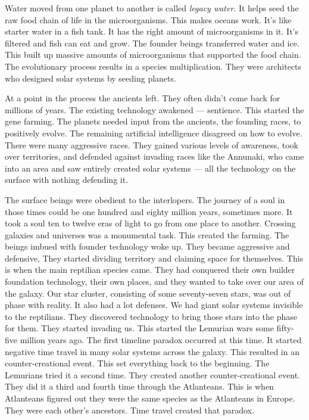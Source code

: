 Water moved from one planet to another is called \emph{legacy water}. It
helps seed the raw food chain of life in the microorganisms. This makes
oceans work. It's like starter water in a fish tank. It has the right
amount of microorganisms in it. It's filtered and fish can eat and grow.
The founder beings transferred water and ice. This built up massive
amounts of microorganisms that supported the food chain. The
evolutionary process results in a species multiplication. They were
architects who designed solar systems by seeding planets.

At a point in the process the ancients left. They often didn't come back
for millions of years. The existing technology awakened --- sentience.
This started the gene farming. The planets needed input from the
ancients, the founding races, to positively evolve. The remaining
artificial intelligence disagreed on how to evolve. There were many
aggressive races. They gained various levels of awareness, took over
territories, and defended against invading races like the Annunaki, who
came into an area and saw entirely created solar systems --- all the
technology on the surface with nothing defending it.

The surface beings were obedient to the interlopers. The journey of a
soul in those times could be one hundred and eighty million years,
sometimes more. It took a soul ten to twelve eras of light to go from
one place to another. Crossing galaxies and universes was a monumental
task. This created the farming. The beings imbued with founder
technology woke up. They became aggressive and defensive, They started
dividing territory and claiming space for themselves. This is when the
main reptilian species came. They had conquered their own builder
foundation technology, their own places, and they wanted to take over
our area of the galaxy. Our star cluster, consisting of some
seventy-seven stars, was out of phase with reality. It also had a lot
defenses. We had giant solar systems invisible to the reptilians. They
discovered technology to bring those stars into the phase for them. They
started invading us. This started the Lemurian wars some fifty-five
million years ago. The first timeline paradox occurred at this time. It
started negative time travel in many solar systems across the galaxy.
This resulted in an counter-creational event. This set everything back
to the beginning. The Lemurians tried it a second time. They created
another counter-creational event. They did it a third and fourth time
through the Atlanteans. This is when Atlanteans figured out they were
the same species as the Atlanteans in Europe. They were each other's
ancestors. Time travel created that paradox.

